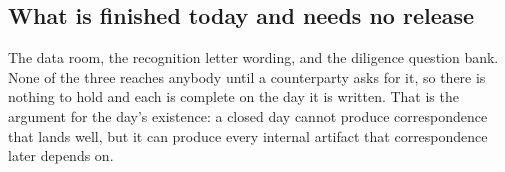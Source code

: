 \subsection{What is finished today and needs no release}

The data room, the recognition letter wording, and the diligence question bank.
None of the three reaches anybody until a counterparty asks for it, so there is
nothing to hold and each is complete on the day it is written. That is the
argument for the day's existence: a closed day cannot produce correspondence that
lands well, but it can produce every internal artifact that correspondence later
depends on.
